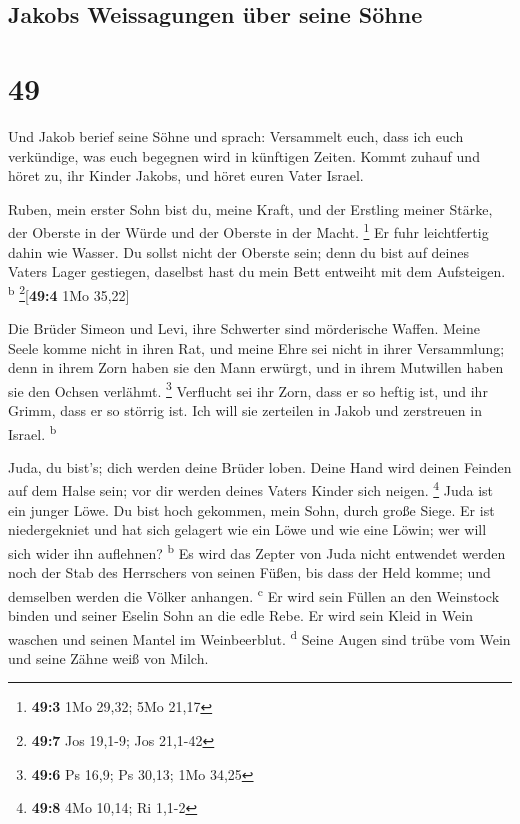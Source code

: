 \hypertarget{jakobs-weissagungen-uxfcber-seine-suxf6hne}{%
\subsection{Jakobs Weissagungen über seine
Söhne}\label{jakobs-weissagungen-uxfcber-seine-suxf6hne}}

\hypertarget{section-48}{%
\section{49}\label{section-48}}

 Und Jakob berief seine Söhne und sprach: Versammelt euch,
dass ich euch verkündige, was euch begegnen wird in künftigen Zeiten.
 Kommt zuhauf und höret zu, ihr Kinder Jakobs, und höret
euren Vater Israel.

 Ruben, mein erster Sohn bist du, meine Kraft, und der
Erstling meiner Stärke, der Oberste in der Würde und der Oberste in der
Macht. \footnote{\textbf{49:3} 1Mo 29,32; 5Mo 21,17}  Er
fuhr leichtfertig dahin wie Wasser. Du sollst nicht der Oberste sein;
denn du bist auf deines Vaters Lager gestiegen, daselbst hast du mein
Bett entweiht mit dem Aufsteigen. \textsuperscript{b}
\footnote{\textbf{49:7} Jos 19,1-9; Jos 21,1-42}{[}\textbf{49:4} 1Mo
35,22{]}

 Die Brüder Simeon und Levi, ihre Schwerter sind
mörderische Waffen.  Meine Seele komme nicht in ihren Rat,
und meine Ehre sei nicht in ihrer Versammlung; denn in ihrem Zorn haben
sie den Mann erwürgt, und in ihrem Mutwillen haben sie den Ochsen
verlähmt. \footnote{\textbf{49:6} Ps 16,9; Ps 30,13; 1Mo 34,25}
 Verflucht sei ihr Zorn, dass er so heftig ist, und ihr
Grimm, dass er so störrig ist. Ich will sie zerteilen in Jakob und
zerstreuen in Israel. \textsuperscript{b}

 Juda, du bist's; dich werden deine Brüder loben. Deine
Hand wird deinen Feinden auf dem Halse sein; vor dir werden deines
Vaters Kinder sich neigen. \footnote{\textbf{49:8} 4Mo 10,14; Ri 1,1-2}
 Juda ist ein junger Löwe. Du bist hoch gekommen, mein
Sohn, durch große Siege. Er ist niedergekniet und hat sich gelagert wie
ein Löwe und wie eine Löwin; wer will sich wider ihn auflehnen?
\textsuperscript{b}  Es wird das Zepter von Juda nicht
entwendet werden noch der Stab des Herrschers von seinen Füßen, bis dass
der Held komme; und demselben werden die Völker anhangen.
\textsuperscript{c}  Er wird sein Füllen an den Weinstock
binden und seiner Eselin Sohn an die edle Rebe. Er wird sein Kleid in
Wein waschen und seinen Mantel im Weinbeerblut. \textsuperscript{d}
 Seine Augen sind trübe vom Wein und seine Zähne weiß von
Milch.

